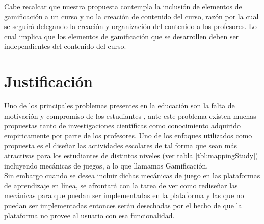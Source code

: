 \noindent Cabe recalcar que nuestra propuesta contempla la inclusión de elementos de gamificación
 a un curso y no la creación de contenido del curso, razón por la cual se seguirá delegando la
 creación y organización del contenido a los profesores. Lo cual implica que los elementos de
 gamificación que se desarrollen deben ser independientes del contenido del curso.
 

\section{Justificación} \label{sec:justificacion} %


 Uno de los principales problemas presentes en la educación son la falta de motivación y compromiso de los estudiantes \cite{Lee}, ante este problema existen muchas propuestas tanto de investigaciones científicas como conocimiento adquirido empiricamente por parte de los profesores. Uno de los enfoques utilizados como propuesta es el diseñar las actividades escolares de tal forma que sean más atractivas para los estudiantes de distintos niveles (ver tabla \ref{tbl:mappingStudy}) incluyendo mecánicas de juegos, a lo que llamamos Gamificación.\\


 \noindent Sin embargo cuando se desea incluir dichas mecánicas de juego en las plataformas de aprendizaje en línea, se afrontará con la tarea de ver como rediseñar las mecánicas para que puedan ser implementadas en la plataforma y las que no puedan ser implementadas entonces serán desechadas por el hecho de que la plataforma no provee al usuario con esa funcionalidad. 

    
